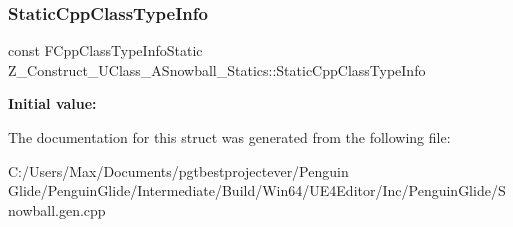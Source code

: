 \subsubsection{\texorpdfstring{StaticCppClassTypeInfo}{StaticCppClassTypeInfo}}
{\footnotesize\ttfamily const F\+Cpp\+Class\+Type\+Info\+Static Z\+\_\+\+Construct\+\_\+\+U\+Class\+\_\+\+A\+Snowball\+\_\+\+Statics\+::\+Static\+Cpp\+Class\+Type\+Info\hspace{0.3cm}{\ttfamily [static]}}

{\bfseries Initial value\+:}
\begin{DoxyCode}{0}
\DoxyCodeLine{= \{}
\DoxyCodeLine{    \}}

\end{DoxyCode}


The documentation for this struct was generated from the following file\+:\begin{DoxyCompactItemize}
\item 
C\+:/\+Users/\+Max/\+Documents/pgtbestprojectever/\+Penguin Glide/\+Penguin\+Glide/\+Intermediate/\+Build/\+Win64/\+U\+E4\+Editor/\+Inc/\+Penguin\+Glide/Snowball.\+gen.\+cpp\end{DoxyCompactItemize}
